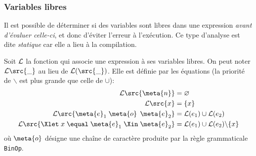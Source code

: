 %
\begin{frame}
\frametitle{Variables libres}

\label{variables_libres}

Il est possible de déterminer si des variables sont libres dans une
expression \emph{avant d'évaluer celle-ci}, et donc d'éviter l'erreur
 à l'exécution. Ce type d'analyse est dite
\emph{statique} car elle a lieu à la compilation.

Soit ${\cal L}$ la fonction qui associe une expression à ses variables
libres. On peut noter ${\cal L} \src{\_}$ au lieu de ${\cal L}
(\src{\_})$. Elle est définie par les équations (la priorité de
$\backslash$ est plus grande que celle de $\cup$):
\begin{align*}
{\cal L} \src{\meta{n}} & = \varnothing\\
{\cal L} \src{x} & = \{x\}\\
{\cal L} \src{\meta{e}_1 \; \meta{o} \;\, \meta{e}_2} & = {\cal
  L} (e_1) \cup {\cal L} (e_2)\\
{\cal L} \src{\Xlet \; x \; \equal \; \meta{e}_1 \; \Xin \;
  \meta{e}_2} & = {\cal L} (e_1) \cup {\cal L} (e_2) \backslash \{x\}
\end{align*}
où $\meta{o}$ désigne une chaîne de caractère produite par la règle
grammaticale \texttt{BinOp}.

\end{frame}

